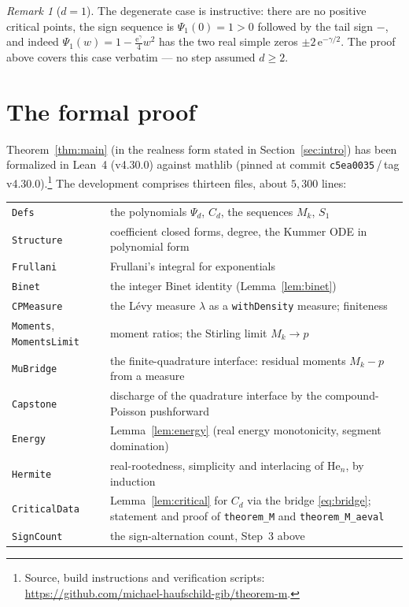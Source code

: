 \documentclass[11pt]{amsart}
\theoremstyle{definition}
\theoremstyle{remark}
\newtheorem{remark}[theorem]{Remark}
\newcommand{\e}{\mathrm{e}}
\newcommand{\He}{\mathrm{He}}
\begin{document}
\begin{remark}[$d=1$]
The degenerate case is instructive: there are no positive critical
points, the sign sequence is $\Psi_1(0)=1>0$ followed by the tail sign
$-$, and indeed
$\Psi_1(w)=1-\tfrac{\e^{\gamma}}{4}w^2$ has the two real simple zeros
$\pm2\,\e^{-\gamma/2}$. The proof above covers this case verbatim ---
no step assumed $d\ge2$.
\end{remark}

\section{The formal proof}\label{sec:lean}

Theorem~\ref{thm:main} (in the realness form stated in
Section~\ref{sec:intro}) has been formalized in Lean~4 (v4.30.0)
against mathlib (pinned at commit
\texttt{c5ea0035}\,/\,tag v4.30.0).\footnote{Source, build
instructions and verification scripts:
\url{https://github.com/michael-haufschild-gib/theorem-m}.} The
development comprises thirteen files, about $5{,}300$ lines:

\begin{center}
\footnotesize
\begin{tabular}{@{}l p{}@{}}
\texttt{Defs} & the polynomials $\Psi_d$, $C_d$, the sequences $M_k$, $S_1$\\
\texttt{Structure} & coefficient closed forms, degree, the Kummer ODE in polynomial form\\
\texttt{Frullani} & Frullani's integral for exponentials\\
\texttt{Binet} & the integer Binet identity (Lemma~\ref{lem:binet})\\
\texttt{CPMeasure} & the L\'evy measure $\lambda$ as a \texttt{withDensity} measure; finiteness\\
\texttt{Moments}, \texttt{MomentsLimit} & moment ratios; the Stirling limit $M_k\to p$\\
\texttt{MuBridge} & the finite-quadrature interface: residual moments $M_k-p$ from a measure\\
\texttt{Capstone} & discharge of the quadrature interface by the compound-Poisson pushforward\\
\texttt{Energy} & Lemma~\ref{lem:energy} (real energy monotonicity, segment domination)\\
\texttt{Hermite} & real-rootedness, simplicity and interlacing of $\He_n$, by induction\\
\texttt{CriticalData} & Lemma~\ref{lem:critical} for $C_d$ via the bridge \eqref{eq:bridge}; statement and proof of \texttt{theorem\_M} and \texttt{theorem\_M\_aeval}\\
\texttt{SignCount} & the sign-alternation count, Step~3 above\\
\end{tabular}
\end{center}
\end{document}
